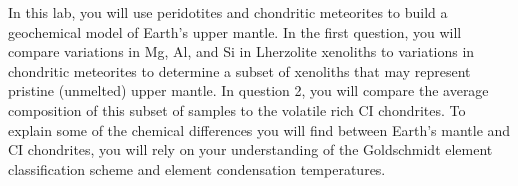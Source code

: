 In this lab, you will use peridotites and chondritic meteorites to build a geochemical model of Earth's upper mantle.
In the first question, you will compare variations in Mg, Al, and Si in Lherzolite xenoliths to variations in chondritic meteorites to determine a subset of xenoliths that may represent pristine (unmelted) upper mantle.
In question 2, you will compare the average composition of this subset of samples to the volatile rich CI chondrites. To explain some of the chemical differences you will find between Earth's mantle and CI chondrites, you will rely on your understanding of the Goldschmidt element classification scheme and element condensation temperatures.
